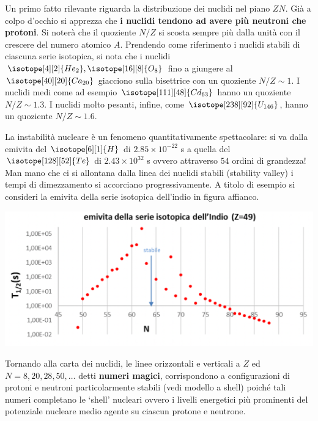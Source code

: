 Un primo fatto rilevante riguarda la distribuzione dei nuclidi nel piano $ ZN $.
Già a colpo d’occhio si apprezza che \textbf{i nuclidi tendono ad avere più neutroni che protoni}.
Si noterà che il quoziente $N/Z$ si scosta sempre più dalla unità con il crescere del numero atomico $A$.
Prendendo come riferimento i nuclidi stabili di ciascuna serie isotopica, si nota che i nuclidi
$ \isotope[4][2]{\mathlarger{He}_{2}} , \isotope[16][8]{\mathlarger{O}_{8}}$ fino a giungere al
$ \isotope[40][20]{\mathlarger{Ca}_{20}} $ giacciono sulla bisettrice con un quoziente $N/Z \sim 1$.
I nuclidi medi come ad esempio $ \isotope[111][48]{\mathlarger{Cd}_{63}} $ hanno un quoziente $N/Z \sim 1.3$.
I nuclidi molto pesanti, infine, come $ \isotope[238][92]{\mathlarger{U}_{146}} $, hanno un quoziente $N/Z \sim 1.6$.


La instabilità nucleare è un fenomeno quantitativamente spettacolare: si va dalla emivita del $ \isotope[6][1]{\mathlarger{H}}
$ di $2.85 \times 10^{-22}$ s a quella del $ \isotope[128][52]{\mathlarger{Te}} $ di $ 2.43 \times 10^{32} $ s ovvero
attraverso $54$ ordini di grandezza!
Man mano che ci si allontana dalla linea dei nuclidi stabili (stability valley) i tempi di dimezzamento si accorciano
progressivamente.
A titolo di esempio si consideri la emivita della serie isotopica dell’indio in figura affianco.

\begin{marginfigure}
    \centering
    \includegraphics[width = 1.35 \textwidth,scale = 1.5]{../figs/emivita-indio}
    \label{fig:emivita-indio}
\end{marginfigure}

Tornando alla carta dei nuclidi, le linee orizzontali e verticali a $Z$ ed $N = 8, 20, 28, 50, \dots$ detti \textbf{numeri magici},
corrispondono a configurazioni di protoni e neutroni particolarmente stabili (vedi modello a shell)
poiché tali numeri completano le `shell’ nucleari ovvero i livelli energetici più prominenti del potenziale nucleare
medio agente su ciascun protone e neutrone.

